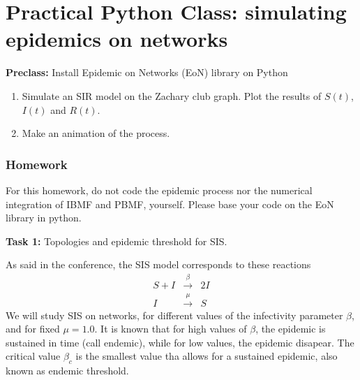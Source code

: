 \section{Practical Python Class: simulating epidemics on networks}


{\bf Preclass:} Install Epidemic on Networks (EoN) library on Python

\begin{enumerate}
 \item Simulate an SIR model on the Zachary club graph. Plot the results of $S(t)$, $I(t)$ and $R(t)$.
\item Make an animation of the process.
\end{enumerate}

\newpage
\subsubsection{Homework}
For this homework,  do not code the epidemic process nor the numerical integration of IBMF and PBMF, yourself. 
Please base your code on the EoN library in python.

{\bf Task 1: } Topologies and epidemic threshold for SIS.

As said in the conference, the SIS model corresponds to these reactions
\begin{eqnarray*}
 S + I &\xrightarrow{\beta}& 2I \\
 I &\xrightarrow{\mu}& S  
\end{eqnarray*}
We will study SIS on networks, for different values of the infectivity parameter $\beta$, and for fixed $\mu = 1.0$. It is known that for high values of $\beta$, the epidemic is sustained in time (call endemic), while for low values, the epidemic disapear. The critical value $\beta_c$ is the smallest value tha allows for a sustained epidemic, also known as endemic threshold.

